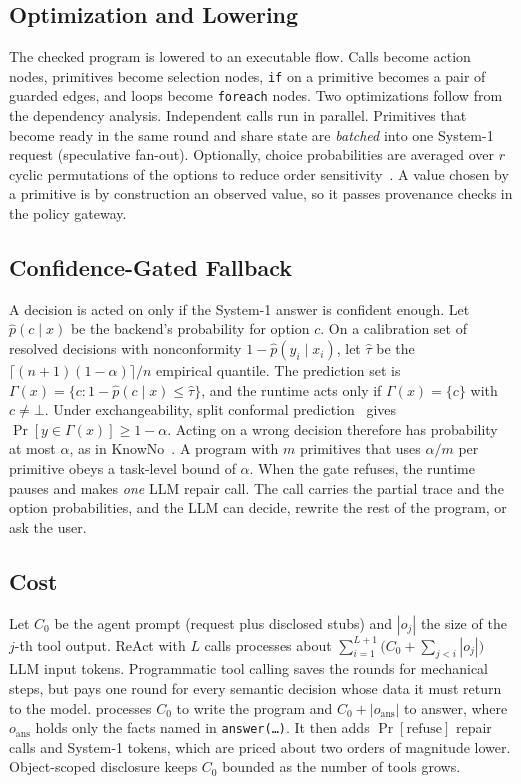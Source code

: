 \subsection{Optimization and Lowering}
\label{sec:lowering}
The checked program is lowered to an executable flow. Calls become action nodes, primitives become selection nodes, \texttt{if} on a primitive becomes a pair of guarded edges, and loops become \texttt{foreach} nodes. Two optimizations follow from the dependency analysis. Independent calls run in parallel. Primitives that become ready in the same round and share state are \emph{batched} into one System-1 request (speculative fan-out). Optionally, choice probabilities are averaged over $r$ cyclic permutations of the options to reduce order sensitivity~\cite{li2026jevjudge}. A value chosen by a primitive is by construction an observed value, so it passes provenance checks in the policy gateway.

\subsection{Confidence-Gated Fallback}
\label{sec:gate}
A decision is acted on only if the System-1 answer is confident enough. Let $\hat p(c\mid x)$ be the backend's probability for option $c$. On a calibration set of resolved decisions with nonconformity $1-\hat p(y_i\mid x_i)$, let $\hat\tau$ be the $\lceil(n+1)(1-\alpha)\rceil/n$ empirical quantile. The prediction set is $\Gamma(x)=\{c:1-\hat p(c\mid x)\le\hat\tau\}$, and the runtime acts only if $\Gamma(x)=\{c\}$ with $c\neq\bot$. Under exchangeability, split conformal prediction~\cite{vovk2005algorithmic,angelopoulos2021gentle} gives $\Pr[y\in\Gamma(x)]\ge1-\alpha$. Acting on a wrong decision therefore has probability at most $\alpha$, as in KnowNo~\cite{ren2023knowno}. A program with $m$ primitives that uses $\alpha/m$ per primitive obeys a task-level bound of $\alpha$. When the gate refuses, the runtime pauses and makes \emph{one} LLM repair call. The call carries the partial trace and the option probabilities, and the LLM can decide, rewrite the rest of the program, or ask the user. 

\subsection{Cost}
\label{sec:cost}
Let $C_0$ be the agent prompt (request plus disclosed stubs) and $|o_j|$ the size of the $j$-th tool output. ReAct with $L$ calls processes about $\sum_{i=1}^{L+1}\bigl(C_0+\sum_{j<i}|o_j|\bigr)$ LLM input tokens. Programmatic tool calling saves the rounds for mechanical steps, but pays one round for every semantic decision whose data it must return to the model. \jif processes $C_0$ to write the program and $C_0+|o_{\mathrm{ans}}|$ to answer, where $o_{\mathrm{ans}}$ holds only the facts named in \texttt{answer(\ldots)}. It then adds $\Pr[\text{refuse}]$ repair calls and System-1 tokens, which are priced about two orders of magnitude lower. Object-scoped disclosure keeps $C_0$ bounded as the number of tools grows. 
